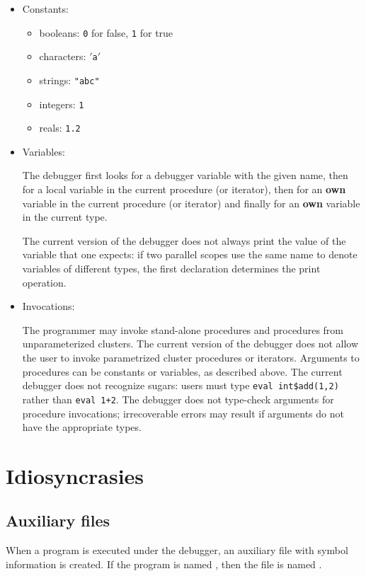 \begin{itemize}
\item{Constants:}
  \begin{itemize}
  \item{booleans: {\tt 0} for false, {\tt 1} for true}
  \item{characters: {\tt $'$a$'$}}
  \item{strings: {\tt "abc"}}
  \item{integers: {\tt 1}}
  \item{reals: {\tt 1.2}}
  \end{itemize}

\item{Variables:}
  
  The debugger first looks for a debugger variable with the given
  name, then for a local variable in the current procedure (or
  iterator), then for an {\bf own} variable in the current procedure
  (or iterator) and finally for an {\bf own} variable in the current
  type.
  
  The current version of the debugger does not always print the
  value of the variable that one expects: if two parallel scopes use
  the same name to denote variables of different types, the first
  declaration determines the print operation.

\item{Invocations:}
  
  The programmer may invoke stand-alone procedures and procedures
  from unparameterized clusters.  The current version of the debugger
  does not allow the user to invoke parametrized cluster procedures or
  iterators.  Arguments to procedures can be constants or variables,
  as described above.  The current debugger does not recognize sugars:
  users must type {\tt eval int\$add(1,2)} rather than {\tt eval 1+2}.
  The debugger does not type-check arguments for procedure
  invocations; irrecoverable errors may result if arguments do not
  have the appropriate types.
\end{itemize}

\section{Idiosyncrasies}

\subsection{Auxiliary files}

When a program is executed under the debugger, an auxiliary file with
symbol information is created.  If the program is named ,
then the file is named .

